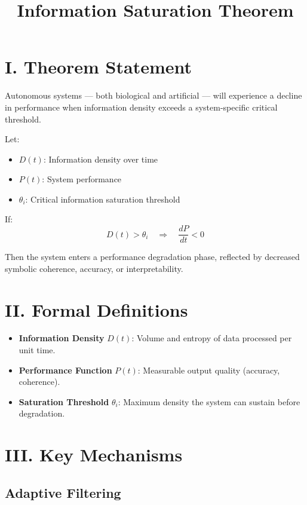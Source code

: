 \documentclass[12pt]{article}
\title{Information Saturation Theorem}
\author{}
\date{}
\begin{document}
\maketitle

\section*{I. Theorem Statement}

Autonomous systems — both biological and artificial — will experience a decline in performance when information density exceeds a system-specific critical threshold.

Let:
\begin{itemize}
  \item $D(t)$: Information density over time
  \item $P(t)$: System performance
  \item $\theta_i$: Critical information saturation threshold
\end{itemize}

If:
\[
D(t) > \theta_i \quad \Rightarrow \quad \frac{dP}{dt} < 0
\]

Then the system enters a performance degradation phase, reflected by decreased symbolic coherence, accuracy, or interpretability.

\section*{II. Formal Definitions}

\begin{itemize}
  \item \textbf{Information Density} $D(t)$: Volume and entropy of data processed per unit time.
  \item \textbf{Performance Function} $P(t)$: Measurable output quality (accuracy, coherence).
  \item \textbf{Saturation Threshold} $\theta_i$: Maximum density the system can sustain before degradation.
\end{itemize}

\section*{III. Key Mechanisms}

\subsection*{Adaptive Filtering}
\end{document}
